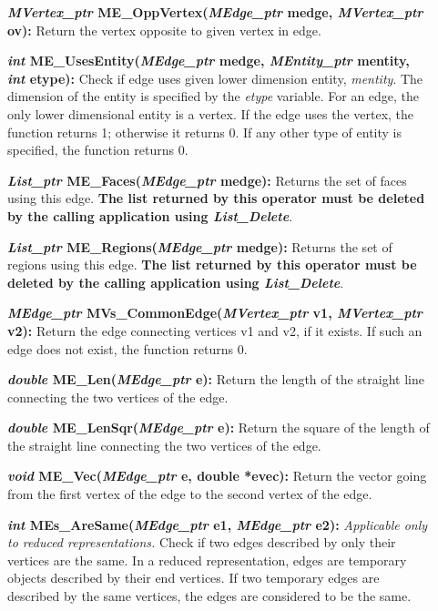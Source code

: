 \documentclass[12pt]{article}
\begin{document}
\begin{description}
\item[]{\bf {\em MVertex\_ptr} ME\_OppVertex({\em MEdge\_ptr}
    medge, {\em MVertex\_ptr} ov):} Return the vertex opposite to
  given vertex in edge.
  
\item[]{\bf {\em int} ME\_UsesEntity({\em MEdge\_ptr} medge,
    {\em MEntity\_ptr} mentity, {\em int} etype):} Check if edge
  uses given lower dimension entity, {\em mentity}. The dimension
  of the entity is specified by the {\em etype} variable. For an
  edge, the only lower dimensional entity is a vertex. If the edge
  uses the vertex, the function returns 1; otherwise it returns 0. If
  any other type of entity is specified, the function returns 0.

  
\item[]{\bf {\em List\_ptr} ME\_Faces({\em MEdge\_ptr}
    medge):} Returns the set of faces using this edge. {\bf The list returned by this
  operator must be deleted by the calling application using {\em List\_Delete}}.
  
\item[]{\bf {\em List\_ptr} ME\_Regions({\em MEdge\_ptr}
    medge):} Returns the set of regions using this edge. {\bf The list returned by this
  operator must be deleted by the calling application using {\em List\_Delete}}.

\item[]
  
\item[]{\bf {\em MEdge\_ptr}
    MVs\_CommonEdge({\em MVertex\_ptr} v1, {\em MVertex\_ptr}
    v2):} Return the edge connecting vertices v1 and v2, if it exists.
  If such an edge does not exist, the function returns 0.
  
\item[]{\bf {\em double} ME\_Len({\em MEdge\_ptr} e):} Return
  the length of the straight line connecting the two vertices of the
  edge.
  
\item[]{\bf {\em double} ME\_LenSqr({\em MEdge\_ptr} e):}
  Return the square of the length of the straight line connecting the
  two vertices of the edge.
  
\item[]{\bf {\em void} ME\_Vec({\em MEdge\_ptr} e, double
    *evec):} Return the vector going from the first vertex of the edge
  to the second vertex of the edge.

\item[]{\bf {\em int} MEs\_AreSame({\em MEdge\_ptr} e1, {\em
      MEdge\_ptr} e2):} {\em Applicable only to reduced
    representations.} Check if two edges described by only their
  vertices are the same. In a reduced representation, edges are
  temporary objects described by their end vertices. If two temporary
  edges are described by the same vertices, the edges are considered
  to be the same.


\end{description}
\end{document}
